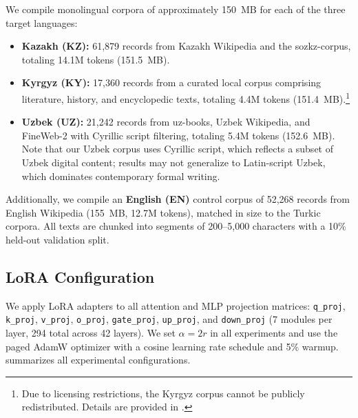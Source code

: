 \documentclass[11pt]{article}
\begin{document}
We compile monolingual corpora of approximately 150~MB for each of the three target languages:
\begin{itemize}
    \item \textbf{Kazakh (KZ):} 61,879 records from Kazakh Wikipedia and the sozkz-corpus, totaling 14.1M tokens (151.5~MB).
    \item \textbf{Kyrgyz (KY):} 17,360 records from a curated local corpus comprising literature, history, and encyclopedic texts, totaling 4.4M tokens (151.4~MB).\footnote{Due to licensing restrictions, the Kyrgyz corpus cannot be publicly redistributed. Details are provided in .}
    \item \textbf{Uzbek (UZ):} 21,242 records from uz-books, Uzbek Wikipedia, and FineWeb-2 with Cyrillic script filtering, totaling 5.4M tokens (152.6~MB). Note that our Uzbek corpus uses Cyrillic script, which reflects a subset of Uzbek digital content; results may not generalize to Latin-script Uzbek, which dominates contemporary formal writing.
\end{itemize}
Additionally, we compile an \textbf{English (EN)} control corpus of 52,268 records from English Wikipedia (155~MB, 12.7M tokens), matched in size to the Turkic corpora. All texts are chunked into segments of 200--5,000 characters with a 10\% held-out validation split.

\subsection{LoRA Configuration}

We apply LoRA adapters to all attention and MLP projection matrices: \texttt{q\_proj}, \texttt{k\_proj}, \texttt{v\_proj}, \texttt{o\_proj}, \texttt{gate\_proj}, \texttt{up\_proj}, and \texttt{down\_proj} (7 modules per layer, 294 total across 42 layers). We set $\alpha = 2r$ in all experiments and use the paged AdamW optimizer with a cosine learning rate schedule and 5\% warmup.  summarizes all experimental configurations.
\end{document}
